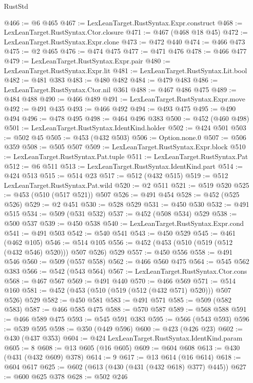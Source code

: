 \begin{lexlean}{RustStd}
\begin{coremodule}
@466 := @6 @465
@467 := LexLeanTarget.RustSyntax.Expr.construct
@468 := LexLeanTarget.RustSyntax.Ctor.closure
@471 := @467 (@468 @18 @45)
@472 := LexLeanTarget.RustSyntax.Expr.clone
@473 := @472 @440
@474 := @466 @473
@475 := @2 @465
@476 := @474 @475
@477 := @471 @476
@478 := @466 @477
@479 := LexLeanTarget.RustSyntax.Expr.pair
@480 := LexLeanTarget.RustSyntax.Expr.lit
@481 := LexLeanTarget.RustSyntax.Lit.bool
@482 := @481 @383
@483 := @480 @482
@484 := @479 @483
@486 := LexLeanTarget.RustSyntax.Ctor.nil @361
@488 := @467 @486 @475
@489 := @484 @488
@490 := @466 @489
@491 := LexLeanTarget.RustSyntax.Expr.move
@492 := @491 @435
@493 := @466 @492
@494 := @493 @475
@495 := @490 @494
@496 := @478 @495
@498 := @464 @496 @383
@500 := @452 (@460 @498)
@501 := LexLeanTarget.RustSyntax.IdentKind.holder
@502 := @424 @501
@503 := @502 @45
@505 := @453 (@432 @503)
@506 := Option.none.{0}
@507 := @506 @359
@508 := @505 @507
@509 := LexLeanTarget.RustSyntax.Expr.block
@510 := LexLeanTarget.RustSyntax.Pat.tuple
@511 := LexLeanTarget.RustSyntax.Pat
@512 := @6 @511
@513 := LexLeanTarget.RustSyntax.IdentKind.part
@514 := @424 @513
@515 := @514 @23
@517 := @512 (@432 @515)
@519 := @512 LexLeanTarget.RustSyntax.Pat.wild
@520 := @2 @511
@521 := @519 @520
@525 := @453 (@510 (@517 @521)) @507
@526 := @491 @454
@528 := @452 (@525 @526)
@529 := @2 @451
@530 := @528 @529
@531 := @450 @530
@532 := @491 @515
@534 := @509 (@531 @532)
@537 := @452 (@508 @534) @529
@538 := @500 @537
@539 := @450 @538
@540 := LexLeanTarget.RustSyntax.Expr.cond
@541 := @491 @503
@542 := @540 @541
@543 := @450 @529
@545 := @461 (@462 @105)
@546 := @514 @105
@556 := @452 (@453 (@510 (@519 (@512 (@432 @546) @520))) @507 @526) @529
@557 := @450 @556
@558 := @491 @546
@560 := @509 (@557 @558)
@562 := @466 @560 @475
@564 := @545 @562 @383
@566 := @542 (@543 @564)
@567 := LexLeanTarget.RustSyntax.Ctor.cons
@568 := @467 @567
@569 := @491 @440
@570 := @466 @569
@571 := @514 @160
@581 := @452 (@453 (@510 (@519 (@512 (@432 @571) @520))) @507 @526) @529
@582 := @450 @581
@583 := @491 @571
@585 := @509 (@582 @583)
@587 := @466 @585 @475
@588 := @570 @587
@589 := @568 @588
@591 := @466 @589 @475
@593 := @545 @591 @383
@595 := @566 (@543 @593)
@596 := @539 @595
@598 := @350 (@449 @596)
@600 := @423 (@426 @23)
@602 := @430 (@437 @353)
@604 := @424 LexLeanTarget.RustSyntax.IdentKind.param
@605 := 8
@608 := @13 @605 (@16 @605)
@609 := @604 @608
@613 := @430 (@431 (@432 @609) @378)
@614 := 9
@617 := @13 @614 (@16 @614)
@618 := @604 @617
@625 := @602 (@613 (@430 (@431 (@432 @618) @377) @445))
@627 := @600 @625 @378
@628 := @502 @246

\end{coremodule}
\end{lexlean}
